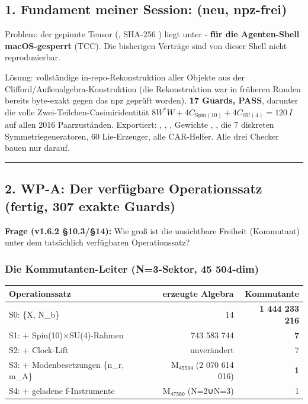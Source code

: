 \subsection{\texorpdfstring{1. Fundament meiner Session:
 (neu,
npz-frei)}{1. Fundament meiner Session:  (neu, npz-frei)}}\label{fundament-meiner-session-native_source.py-neu-npz-frei}

Problem: der gepinnte Tensor (, SHA-256
) liegt unter 
- \textbf{für die Agenten-Shell macOS-gesperrt} (TCC). Die bisherigen
Verträge sind von dieser Shell nicht reproduzierbar.

Lösung: vollständige in-repo-Rekonstruktion aller Objekte aus der
Clifford/Außenalgebra-Konstruktion (die Rekonstruktion war in früheren
Runden bereits byte-exakt gegen das npz geprüft worden). \textbf{17
Guards, PASS}, darunter die volle Zwei-Teilchen-Casimiridentität
\(8W^\dagger W+4C_{\text{Spin}(10)}+4C_{\text{SU}(4)}=120\,I\) auf allen
2016 Paarzuständen. Exportiert: , ,
, Gewichte , , die 7
diskreten Symmetriegeneratoren, 60 Lie-Erzeuger, alle CAR-Helfer. Alle
drei Checker bauen nur darauf.

\begin{center}\rule{0.5\linewidth}{0.5pt}\end{center}

\subsection{2. WP-A: Der verfügbare Operationssatz (fertig, 307 exakte
Guards)}\label{wp-a-der-verfuxfcgbare-operationssatz-fertig-307-exakte-guards}

\textbf{Frage (v1.6.2 §10.3/§14):} Wie groß ist die unsichtbare Freiheit
(Kommutant) unter dem tatsächlich verfügbaren Operationssatz?

\subsubsection{Die Kommutanten-Leiter (N=3-Sektor, 45
504-dim)}\label{die-kommutanten-leiter-n3-sektor-45-504-dim}

{\def\LTcaptype{none} %
\begin{longtable}[]{@{}lrr@{}}
\toprule\noalign{}
Operationssatz & erzeugte Algebra & Kommutante \\
\midrule\noalign{}
\endhead
\bottomrule\noalign{}
\endlastfoot
S0: \{X, N\_b\} & 14 & \textbf{1 444 233 216} \\
S1: + Spin(10)×SU(4)-Rahmen & 743 583 744 & \textbf{7} \\
S2: + Clock-Lift & unverändert & 7 \\
S3: + Modenbesetzungen \{n\_r, m\_A\} & M₄₅₅₀₄ (2 070 614 016) &
\textbf{1} \\
S4: + geladene f-Instrumente & M₄₇₅₈₀ (N=2∪N=3) & 1 \\
\end{longtable}
}

